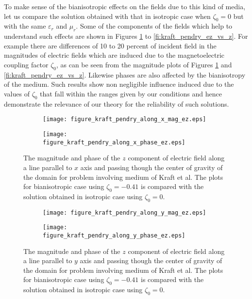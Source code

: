 To make sense of the bianisotropic effects on the fields due to this kind of media, 
let us compare the solution obtained with that in isotropic case when $\zeta_0 = 0$ but with the same $\varepsilon_r$ and $\mu_r$.
Some of the components of the fields which help to understand such effects are shown in  Figures \ref{fi:kraft_pendry_ez_vs_x} to  \ref{fi:kraft_pendry_ez_vs_z}.
For example there are differences of 10 to 20 percent of incident field in the magnitudes of electric fields which are induced due to the magnetoelectric 
coupling factor $\zeta_0$, as can be seen from the magnitude plots of Figures \ref{fi:kraft_pendry_ez_vs_x} and \ref{fi:kraft_pendry_ez_vs_z}. 
Likewise phases are also affected by the bianisotropy of the medium.
Such results show non negligible influence induced due to the values of $\zeta_0$ that fall within the ranges 
given by our conditions and hence demonstrate the relevance of our theory for the reliability of such solutions.

\begin{figure}[H]
\centering
\begin{subfigure}[b]{0.49\textwidth}
\texttt{[image: figure\_kraft\_pendry\_along\_x\_mag\_ez.eps]}
\end{subfigure}
%
\begin{subfigure}[b]{0.49\textwidth}
\centering
\texttt{[image: figure\_kraft\_pendry\_along\_x\_phase\_ez.eps]}
\end{subfigure}
\caption{The magnitude and phase of the $z$ component of electric field along a line parallel to $x$ axis 
and passing though the center of gravity of the domain for problem involving medium of Kraft et al. 
The plots for bianisotropic case  using $\zeta_0 = -0.41$ is compared with 
the solution obtained in isotropic case using $\zeta_0 = 0$.}
\label{fi:kraft_pendry_ez_vs_x}
\end{figure}

\begin{figure}[H]
\centering
\begin{subfigure}[b]{0.49\textwidth}
\texttt{[image: figure\_kraft\_pendry\_along\_y\_mag\_ez.eps]}
\end{subfigure}
%
\begin{subfigure}[b]{0.49\textwidth}
\centering
\texttt{[image: figure\_kraft\_pendry\_along\_y\_phase\_ez.eps]}
\end{subfigure}
\caption{The magnitude and phase of the $z$ component of electric field along a line parallel to $y$ axis 
and passing though the center of gravity of the domain  for problem involving medium of Kraft et al. 
The plots for bianisotropic case using $\zeta_0 = -0.41$ is compared with 
the solution obtained in isotropic case using $\zeta_0 = 0$. }
\label{fi:kraft_pendry_ez_vs_y}
\end{figure}

